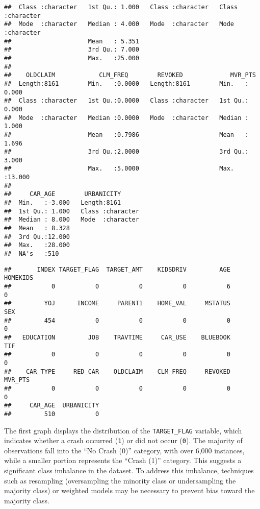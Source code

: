 \documentclass[
]{article}
\begin{document}
\begin{verbatim}
##  Class :character   1st Qu.: 1.000   Class :character   Class :character  
##  Mode  :character   Median : 4.000   Mode  :character   Mode  :character  
##                     Mean   : 5.351                                        
##                     3rd Qu.: 7.000                                        
##                     Max.   :25.000                                        
##                                                                           
##    OLDCLAIM            CLM_FREQ        REVOKED             MVR_PTS      
##  Length:8161        Min.   :0.0000   Length:8161        Min.   : 0.000  
##  Class :character   1st Qu.:0.0000   Class :character   1st Qu.: 0.000  
##  Mode  :character   Median :0.0000   Mode  :character   Median : 1.000  
##                     Mean   :0.7986                      Mean   : 1.696  
##                     3rd Qu.:2.0000                      3rd Qu.: 3.000  
##                     Max.   :5.0000                      Max.   :13.000  
##                                                                         
##     CAR_AGE        URBANICITY       
##  Min.   :-3.000   Length:8161       
##  1st Qu.: 1.000   Class :character  
##  Median : 8.000   Mode  :character  
##  Mean   : 8.328                     
##  3rd Qu.:12.000                     
##  Max.   :28.000                     
##  NA's   :510
\end{verbatim}

\begin{verbatim}
##       INDEX TARGET_FLAG  TARGET_AMT    KIDSDRIV         AGE    HOMEKIDS 
##           0           0           0           0           6           0 
##         YOJ      INCOME     PARENT1    HOME_VAL     MSTATUS         SEX 
##         454           0           0           0           0           0 
##   EDUCATION         JOB    TRAVTIME     CAR_USE    BLUEBOOK         TIF 
##           0           0           0           0           0           0 
##    CAR_TYPE     RED_CAR    OLDCLAIM    CLM_FREQ     REVOKED     MVR_PTS 
##           0           0           0           0           0           0 
##     CAR_AGE  URBANICITY 
##         510           0
\end{verbatim}

The first graph displays the distribution of the \texttt{TARGET\_FLAG}
variable, which indicates whether a crash occurred (\texttt{1}) or did
not occur (\texttt{0}). The majority of observations fall into the ``No
Crash (0)'' category, with over 6,000 instances, while a smaller portion
represents the ``Crash (1)'' category. This suggests a significant class
imbalance in the dataset. To address this imbalance, techniques such as
resampling (oversampling the minority class or undersampling the
majority class) or weighted models may be necessary to prevent bias
toward the majority class.
\end{document}
